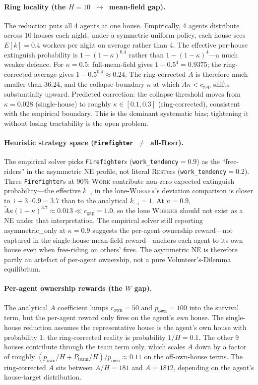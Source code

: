 \documentclass{anvil-paper}
\begin{document}
\paragraph{Ring locality (the $H{=}10$~$\to$~mean-field gap).}
The reduction puts all 4 agents at one house. Empirically, 4 agents
distribute across 10 houses each night; under a symmetric uniform
policy, each house sees $E[k]=0.4$ workers per night on average rather
than 4. The effective per-house extinguish probability is
$1-(1-\kappa)^{0.4}$ rather than $1-(1-\kappa)^4$---a much weaker
defence. For $\kappa{=}0.5$: full-mean-field gives $1-0.5^4=0.9375$;
the ring-corrected average gives $1-0.5^{0.4}\approx 0.24$. The
ring-corrected $\tilde A$ is therefore much smaller than 36.24, and the
collapse boundary $\kappa$ at which $\tilde A\kappa<c_{\text{gap}}$
shifts substantially upward. Predicted correction: the collapse
threshold moves from $\kappa{=}0.028$ (single-house) to roughly
$\kappa\in[0.1,0.3]$ (ring-corrected), consistent with the empirical
boundary. This is the dominant systematic bias; tightening it without
losing tractability is the open problem.

\paragraph{Heuristic strategy space (\texttt{Firefighter}~$\neq$~all-\textsc{Rest}).}
The empirical solver picks \texttt{Firefighter}s
(\texttt{work\_tendency}${=}0.9$) as the ``free-riders'' in the
asymmetric NE profile, not literal \textsc{Rest}ers
(\texttt{work\_tendency}${=}0.2$). Three \texttt{Firefighter}s at 90\%
\textsc{Work} contribute non-zero expected extinguish probability---the
effective $k_{-i}$ in the lone-\textsc{Worker}'s deviation comparison is
closer to $1+3\cdot 0.9=3.7$ than to the analytical $k_{-i}{=}1$. At
$\kappa{=}0.9$, $\tilde A\kappa(1-\kappa)^{3.7}\approx 0.013\ll
c_{\text{gap}}{=}1.0$, so the lone \textsc{Worker} should not exist as
a NE under that interpretation. The empirical solver still reporting
\textsf{asymmetric\_only} at $\kappa{=}0.9$ suggests the per-agent
ownership reward---not captured in the single-house mean-field
reward---anchors each agent to its own house even when free-riding on
others' fires. The asymmetric NE is therefore partly an artefact of
per-agent ownership, not a pure Volunteer's-Dilemma equilibrium.

\paragraph{Per-agent ownership rewards (the $W$ gap).}
The analytical $A$ coefficient lumps $r_{\text{own}}{=}50$ and
$p_{\text{own}}{=}100$ into the survival term, but the per-agent reward
only fires on the agent's \emph{own} house. The single-house reduction
assumes the representative house is the agent's own house with
probability 1; the ring-corrected reality is probability
$1/H{=}0.1$. The other 9 houses contribute through the team term only,
which scales $A$ down by a factor of roughly
$(p_{\text{own}}/H+P_{\text{team}}/H)/p_{\text{own}}\approx 0.11$ on
the off-own-house terms. The ring-corrected $A$ sits between
$A/H{=}181$ and $A{=}1812$, depending on the agent's house-target
distribution.
\end{document}
